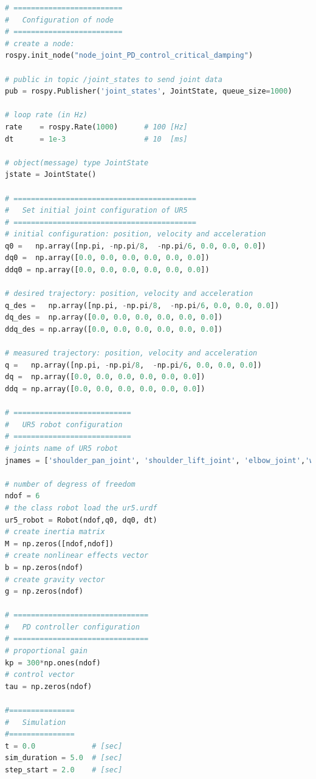 \begin{lstlisting}[language=Python,caption={Rosnode to move the second and fifth joint of UR5 robot with the requirement motion of activity 1.5.}, label={lst:joint_PD_control_critical_damping}]
# =========================
#   Configuration of node
# =========================
# create a node: 
rospy.init_node("node_joint_PD_control_critical_damping")

# public in topic /joint_states	to send joint data	
pub = rospy.Publisher('joint_states', JointState, queue_size=1000)

# loop rate (in Hz)
rate 	= rospy.Rate(1000)		# 100 [Hz]
dt 		= 1e-3					# 10  [ms]

# object(message) type JointState
jstate = JointState()

# ==========================================
#   Set initial joint configuration of UR5
# ==========================================
# initial configuration: position, velocity and acceleration 
q0 =   np.array([np.pi, -np.pi/8,  -np.pi/6, 0.0, 0.0, 0.0])
dq0 =  np.array([0.0, 0.0, 0.0, 0.0, 0.0, 0.0]) 
ddq0 = np.array([0.0, 0.0, 0.0, 0.0, 0.0, 0.0]) 

# desired trajectory: position, velocity and acceleration
q_des =   np.array([np.pi, -np.pi/8,  -np.pi/6, 0.0, 0.0, 0.0]) 
dq_des =  np.array([0.0, 0.0, 0.0, 0.0, 0.0, 0.0]) 
ddq_des = np.array([0.0, 0.0, 0.0, 0.0, 0.0, 0.0]) 

# measured trajectory: position, velocity and acceleration
q =   np.array([np.pi, -np.pi/8,  -np.pi/6, 0.0, 0.0, 0.0])
dq =  np.array([0.0, 0.0, 0.0, 0.0, 0.0, 0.0]) 
ddq = np.array([0.0, 0.0, 0.0, 0.0, 0.0, 0.0]) 

# ===========================
#   UR5 robot configuration
# ===========================
# joints name of UR5 robot
jnames = ['shoulder_pan_joint', 'shoulder_lift_joint', 'elbow_joint','wrist_1_joint', 'wrist_2_joint', 'wrist_3_joint']

# number of degress of freedom
ndof = 6
# the class robot load the ur5.urdf
ur5_robot = Robot(ndof,q0, dq0, dt)
# create inertia matrix 
M = np.zeros([ndof,ndof])
# create nonlinear effects vector
b = np.zeros(ndof)
# create gravity vector
g = np.zeros(ndof)

# ===============================
#   PD controller configuration
# ===============================
# proportional gain
kp = 300*np.ones(ndof)
# control vector
tau = np.zeros(ndof)    

#===============
#   Simulation
#===============
t = 0.0             # [sec] 
sim_duration = 5.0  # [sec]
step_start = 2.0    # [sec]


\end{lstlisting}
